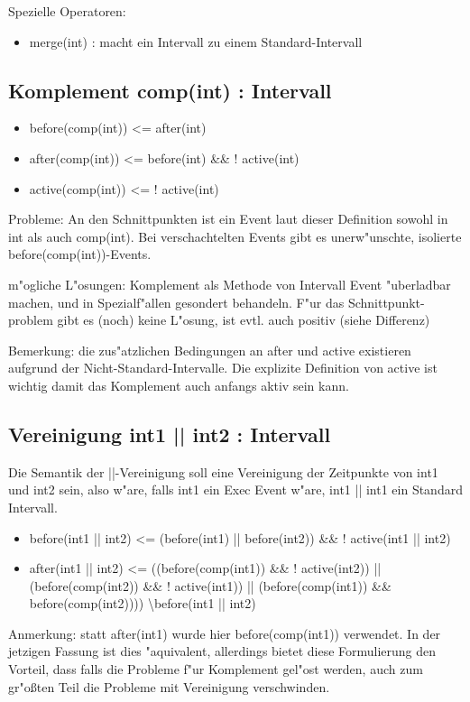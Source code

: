 \documentclass[article,colorback,accentcolor=tud4c]{tudreport}
\begin{document}
Spezielle Operatoren:
\begin{itemize}
\item merge(int) : macht ein Intervall zu einem Standard-Intervall
\end{itemize}

\subsection{Komplement comp(int) : Intervall}
\begin{itemize}
\item before(comp(int)) <= after(int)
\item after(comp(int)) <= before(int) \&\& ! active(int)
\item active(comp(int)) <= ! active(int)
\end{itemize}
Probleme: An den Schnittpunkten ist ein Event laut dieser Definition sowohl in int als auch comp(int). Bei verschachtelten Events gibt es unerw"unschte, isolierte before(comp(int))-Events.

m"ogliche L"osungen: Komplement als Methode von Intervall Event "uberladbar machen, und in Spezialf"allen gesondert behandeln. F"ur das Schnittpunkt-problem gibt es (noch) keine L"osung, ist evtl. auch positiv (siehe Differenz)

Bemerkung: die zus"atzlichen Bedingungen an after und active existieren aufgrund der Nicht-Standard-Intervalle. Die explizite Definition von active ist wichtig damit das Komplement auch anfangs aktiv sein kann.

\subsection{Vereinigung int1 || int2 : Intervall}
Die Semantik der ||-Vereinigung soll eine Vereinigung der Zeitpunkte von int1 und int2 sein, also w"are, falls int1 ein Exec Event w"are, int1 || int1 ein Standard Intervall.
\begin{itemize}
\item before(int1 || int2)  <= (before(int1) || before(int2)) \&\& ! active(int1 || int2)
\item after(int1 || int2) <= ((before(comp(int1)) \&\& ! active(int2)) || (before(comp(int2)) \&\& ! active(int1)) || (before(comp(int1)) \&\& before(comp(int2)))) \textbackslash before(int1 || int2)
\end{itemize}
Anmerkung: statt after(int1) wurde hier before(comp(int1)) verwendet. In der jetzigen Fassung ist dies "aquivalent, allerdings bietet diese Formulierung den Vorteil, dass falls die Probleme f"ur Komplement gel"ost werden, auch zum gr"o\ss ten Teil die Probleme mit Vereinigung verschwinden.
\end{document}
